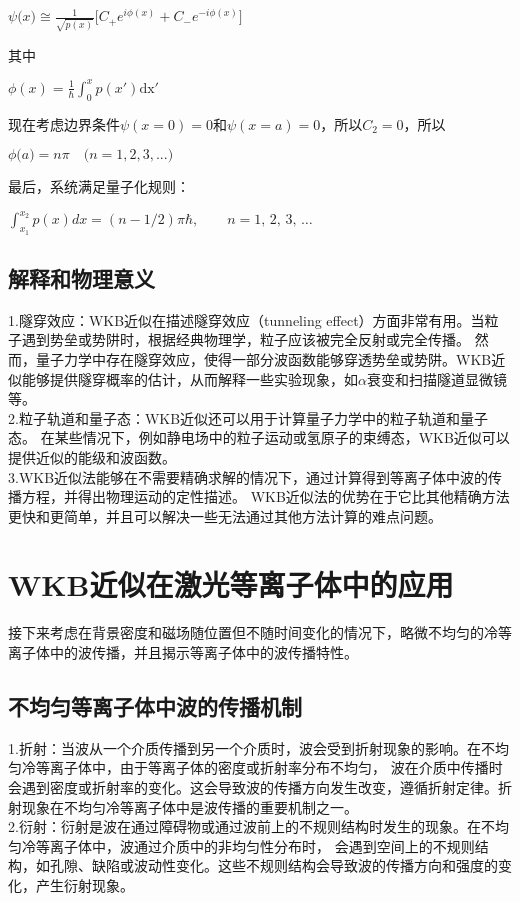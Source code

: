 \documentclass[12pt, a4paper, oneside]{ctexart}
\begin{document}
\begin{spacing}{2.0}
\begin{center}
    $\displaystyle\psi\big(x\big)\cong\frac{1}{\sqrt{p(x)}}\biggl[C_+e^{i\phi(x)}+C_-e^{-i\phi(x)}\biggr]$
\end{center}
其中
\begin{center}
    $\displaystyle \phi(x) = \frac{1}{\hbar}\int_0^xp(x')\mathrm{dx'}$
\end{center}
现在考虑边界条件$\psi(x=0)=0$和$\psi(x=a)=0$，所以$C_2=0$，所以
\begin{center}
    $\phi\bigl(a\bigr)=n\pi\quad\bigl(n=1,2,3,...\bigr)$
\end{center}
最后，系统满足量子化规则：
\begin{center}
    $\displaystyle \int_{x_1}^{x_2} p(x)dx =(n - 1/2)\pi\hbar,\qquad n=1,\,2,\,3,\,\dots\,\!$
\end{center}

\subsection{解释和物理意义}
1.隧穿效应：WKB近似在描述隧穿效应（tunneling effect）方面非常有用。当粒子遇到势垒或势阱时，根据经典物理学，粒子应该被完全反射或完全传播。
然而，量子力学中存在隧穿效应，使得一部分波函数能够穿透势垒或势阱。WKB近似能够提供隧穿概率的估计，从而解释一些实验现象，如$\alpha$衰变和扫描隧道显微镜等。
\\
2.粒子轨道和量子态：WKB近似还可以用于计算量子力学中的粒子轨道和量子态。
在某些情况下，例如静电场中的粒子运动或氢原子的束缚态，WKB近似可以提供近似的能级和波函数。
\\
3.WKB近似法能够在不需要精确求解的情况下，通过计算得到等离子体中波的传播方程，并得出物理运动的定性描述。
WKB近似法的优势在于它比其他精确方法更快和更简单，并且可以解决一些无法通过其他方法计算的难点问题。
\section{WKB近似在激光等离子体中的应用}
接下来考虑在背景密度和磁场随位置但不随时间变化的情况下，略微不均匀的冷等离子体中的波传播，并且揭示等离子体中的波传播特性。
\subsection{不均匀等离子体中波的传播机制}
1.折射：当波从一个介质传播到另一个介质时，波会受到折射现象的影响。在不均匀冷等离子体中，由于等离子体的密度或折射率分布不均匀，
波在介质中传播时会遇到密度或折射率的变化。这会导致波的传播方向发生改变，遵循折射定律。折射现象在不均匀冷等离子体中是波传播的重要机制之一。
\\
2.衍射：衍射是波在通过障碍物或通过波前上的不规则结构时发生的现象。在不均匀冷等离子体中，波通过介质中的非均匀性分布时，
会遇到空间上的不规则结构，如孔隙、缺陷或波动性变化。这些不规则结构会导致波的传播方向和强度的变化，产生衍射现象。
\\



\end{spacing}
\end{document}

